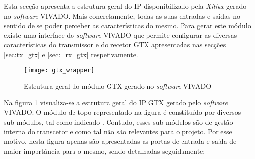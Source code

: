 Esta secção apresenta a estrutura geral do IP disponibilizado pela \textit{Xilinx} gerado no \textit{software} VIVADO. Mais concretamente, todas as suas entradas e saídas  no sentido de se poder perceber as características do mesmo.  Para gerar este módulo existe uma interface do \textit{software} VIVADO que permite configurar as diversas características do transmissor e do recetor GTX apresentadas nas secções \ref{sec:tx_gtx} e \ref{sec:_rx_gtx} respetivamente. 

\begin{figure}[h!]
	\begin{center}
		\leavevmode
		\texttt{[image: gtx\_wrapper]}
		\captionsetup{width=1.0\linewidth}
		\caption[Estrutura geral do módulo GTX  gerado no \textit{software} VIVADO]{Estrutura geral do módulo GTX gerado no \textit{software} VIVADO}
		\label{fig:gtx_wrapper}
	\end{center}
\end{figure}

Na figura \ref{fig:gtx_wrapper} visualiza-se a estrutura geral do IP GTX gerado pelo \textit{software} VIVADO. O módulo de topo representado na figura é constituído por diversos sub-módulos, tal como indicado \cite{R022}. Contudo, esses sub-módulos são de gestão interna do transcetor e como tal não são relevantes para o projeto. Por esse motivo, nesta figura apenas são apresentadas as portas de entrada e saída de maior importância para o mesmo, sendo detalhadas seguidamente:

